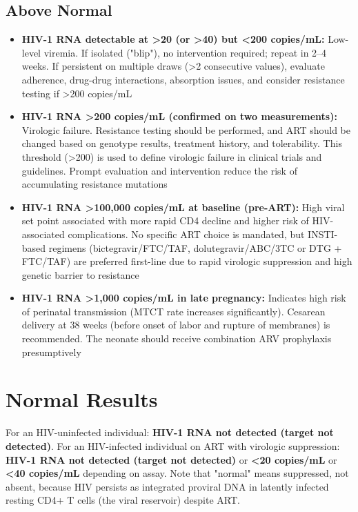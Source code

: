 \subsection*{Above Normal}
\begin{itemize}
  \item \textbf{HIV-1 RNA detectable at >20 (or >40) but <200 copies/mL:} Low-level viremia. If isolated ("blip"), no intervention required; repeat in 2--4 weeks. If persistent on multiple draws (>2 consecutive values), evaluate adherence, drug-drug interactions, absorption issues, and consider resistance testing if >200 copies/mL
  \item \textbf{HIV-1 RNA >200 copies/mL (confirmed on two measurements):} Virologic failure. Resistance testing should be performed, and ART should be changed based on genotype results, treatment history, and tolerability. This threshold (>200) is used to define virologic failure in clinical trials and guidelines. Prompt evaluation and intervention reduce the risk of accumulating resistance mutations
  \item \textbf{HIV-1 RNA >100,000 copies/mL at baseline (pre-ART):} High viral set point associated with more rapid CD4 decline and higher risk of HIV-associated complications. No specific ART choice is mandated, but INSTI-based regimens (bictegravir/FTC/TAF, dolutegravir/ABC/3TC or DTG + FTC/TAF) are preferred first-line due to rapid virologic suppression and high genetic barrier to resistance
  \item \textbf{HIV-1 RNA >1,000 copies/mL in late pregnancy:} Indicates high risk of perinatal transmission (MTCT rate increases significantly). Cesarean delivery at 38 weeks (before onset of labor and rupture of membranes) is recommended. The neonate should receive combination ARV prophylaxis presumptively
\end{itemize}

\section*{Normal Results}
For an HIV-uninfected individual: \textbf{HIV-1 RNA not detected (target not detected)}. For an HIV-infected individual on ART with virologic suppression: \textbf{HIV-1 RNA not detected (target not detected)} or \textbf{<20 copies/mL} or \textbf{<40 copies/mL} depending on assay. Note that "normal" means suppressed, not absent, because HIV persists as integrated proviral DNA in latently infected resting CD4+ T cells (the viral reservoir) despite ART.

